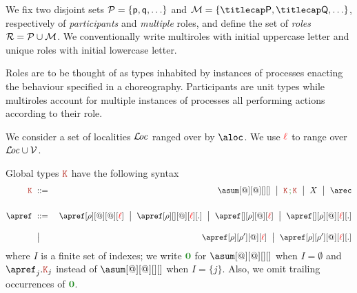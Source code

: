 %

We fix two disjoint sets $\participants = \{\ptp p, \ptp q, \ldots\}$
and $\multiroles = \{\amulti P, \amulti Q, \ldots \}$, respectively of
\emph{participants} and \emph{multiple} roles, and define the set of
\emph{roles} $\mathcal{R} = \mathcal{P} \cup \mathcal{M}$.
%
We conventionally write multiroles with initial uppercase letter and
unique roles with initial lowercase letter.
%

Roles are to be thought of as types inhabited by instances of
processes enacting the behaviour specified in a choreography.
%
Participants are unit types while multiroles account for multiple
instances of processes all performing actions according to their role.

We consider a set of localities $\mathcal{L}\!\mathit{oc}$ ranged over by $\aloc$. We use 
${\color{red}\ell}$ to range over $\mathcal{L}\!\mathit{oc}\cup\mathcal{V}$.

Global types $\aK$ have the following syntax
\begin{eqnarray*}
  \aK & \bnfdef & \asum[@][@][][]
                  \bnfmid
                  \aK \seqop \aK \bnfmid
                  X \bnfmid
                  \arec
  \\[1.5em]
  \apref & \bnfdef & \apref[\arole][@][@][\alocvar] \bnfmid
                     \apref[\arole][{}][@][\alocvar][.] \bnfmid
                     \apref[{}][\arole][@][\alocvar] \bnfmid
                     \apref[{}][\arole][@][\alocvar][.]
  \\[1em]
        & \bnfmid & \apref[\arole][\arole'][@][\alocvar] \bnfmid
                    \apref[\arole][\arole'][@][\alocvar][.]
\end{eqnarray*}
where $I$ is a finite set of indexes; we write $\nil$ for
$\asum[@][@][][]$ when $I = \emptyset$ and $\apref_j.\aK_j$ instead of
$\asum[@][@][][]$ when $I = \{j\}$.
%
Also, we omit trailing occurrences of $\nil$.

